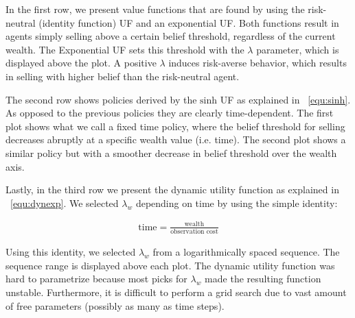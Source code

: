 In the first row, we present value functions that are found by using the risk-neutral (identity function) UF and an exponential UF. Both functions result in agents simply selling above a certain belief threshold, regardless of the current wealth.
The Exponential UF sets this threshold with the $\lambda$ parameter, which is displayed above the plot.
A positive $\lambda$ induces risk-averse behavior, which results in selling with higher belief than the risk-neutral agent.

The second row shows policies derived by the $\text{sinh}$ UF as explained in ~\autoref{equ:sinh}. As opposed to the previous policies they are clearly time-dependent.
The first plot shows what we call a fixed time policy, where the belief threshold for selling decreases abruptly at a specific wealth value (i.e. time).
The second plot shows a similar policy but with a smoother decrease in belief threshold over the wealth axis.

Lastly, in the third row we present the dynamic utility function as explained in ~\autoref{equ:dynexp}.
We selected $\lambda_w$ depending on time by using the simple identity:

\begin{align*}
\text{time} = \frac{\text{wealth}}{\text{observation\ cost}}
\end{align*}

Using this identity, we selected $\lambda_w$ from a logarithmically spaced sequence.
The sequence range is displayed above each plot.
The dynamic utility function was hard to parametrize because most picks for $\lambda_w$ made the resulting function unstable.
Furthermore, it is difficult to perform a grid search due to vast amount of free parameters (possibly as many as time steps).

